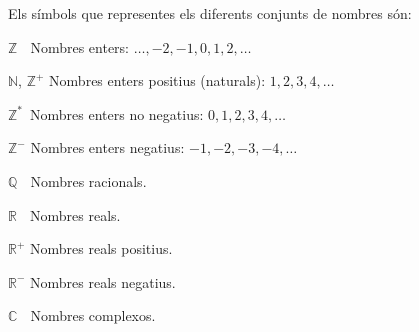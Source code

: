 \pagebreak

Els símbols que representes els diferents conjunts de nombres són:

\begin{list}{}
{\setlength{\labelwidth}{15mm} \setlength{\leftmargin}{20mm}
\setlength{\labelsep}{5mm}}
    \item[$\mathbb{Z\phantom{{}^+}}$] Nombres enters: $\ldots,-2,-1,0,1,2,\ldots$
    \item[$\mathbb{N}$, $\mathbb{Z}^+$] Nombres enters positius
    (naturals): $1,2,3,4,\ldots$
    \item[$\mathbb{Z}^*\,$] Nombres enters no negatius: $0,1,2,3,4,\ldots$
    \item[$\mathbb{Z}^-$] Nombres enters negatius: $-1,-2,-3,-4,\ldots$
    \item[$\mathbb{Q\phantom{{}^+}}$] Nombres racionals.
    \item[$\mathbb{R\phantom{{}^+}}$] Nombres reals.
    \item[$\mathbb{R}^+$] Nombres reals positius.
    \item[$\mathbb{R}^-$] Nombres reals negatius.
    \item[$\mathbb{C\phantom{{}^+}}$] Nombres complexos.
\end{list}
 
 
 
 
 
